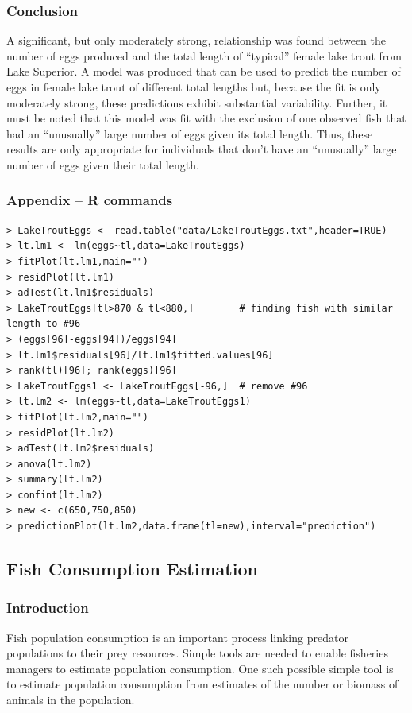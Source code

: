 \documentclass[10pt,openany]{book}\usepackage[]{graphicx}\usepackage[]{color}
\begin{document}
\subsubsection*{Conclusion}
A significant, but only moderately strong, relationship was found between the number of eggs produced and the total length of ``typical'' female lake trout from Lake Superior.  A model was produced that can be used to predict the number of eggs in female lake trout of different total lengths but, because the fit is only moderately strong, these predictions exhibit substantial variability.  Further, it must be noted that this model was fit with the exclusion of one observed fish that had an ``unusually'' large number of eggs given its total length.  Thus, these results are only appropriate for individuals that don't have an ``unusually'' large number of eggs given their total length.

\subsubsection*{Appendix -- R commands}
\begin{Verbatim}[formatcom=\color{red},xleftmargin=5mm,commandchars=\\\{\}]
> LakeTroutEggs <- read.table("data/LakeTroutEggs.txt",header=TRUE)
> lt.lm1 <- lm(eggs~tl,data=LakeTroutEggs)
> fitPlot(lt.lm1,main="")
> residPlot(lt.lm1)
> adTest(lt.lm1$residuals)
> LakeTroutEggs[tl>870 & tl<880,]        # finding fish with similar length to #96
> (eggs[96]-eggs[94])/eggs[94]
> lt.lm1$residuals[96]/lt.lm1$fitted.values[96]
> rank(tl)[96]; rank(eggs)[96]
> LakeTroutEggs1 <- LakeTroutEggs[-96,]  # remove #96
> lt.lm2 <- lm(eggs~tl,data=LakeTroutEggs1)
> fitPlot(lt.lm2,main="")
> residPlot(lt.lm2)
> adTest(lt.lm2$residuals)
> anova(lt.lm2)
> summary(lt.lm2)
> confint(lt.lm2)
> new <- c(650,750,850)
> predictionPlot(lt.lm2,data.frame(tl=new),interval="prediction")
\end{Verbatim}


\subsection{Fish Consumption Estimation}
\subsubsection*{Introduction}

Fish population consumption is an important process linking predator populations to their prey resources.  Simple tools are needed to enable fisheries managers to estimate population consumption.  One such possible simple tool is to estimate population consumption from estimates of the number or biomass of animals in the population.
\end{document}
